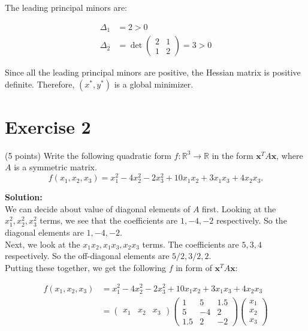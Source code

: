 \documentclass{article}
\begin{document}
The leading principal minors are:

\begin{align*}
    \Delta_1 &= 2 > 0 \\
    \Delta_2 &= \det\begin{pmatrix}
        2 & 1 \\
        1 & 2
    \end{pmatrix} = 3 > 0
\end{align*}

Since all the leading principal minors are positive, the Hessian matrix is positive definite. Therefore, $(x^*,y^*)$ is a global minimizer.

\newpage

\section*{Exercise 2}
(5 points) Write the following quadratic form $f: \mathbb{R}^3 \to \mathbb{R}$ in the form $\mathbf{x}^T A\mathbf{x}$, where $A$ is a symmetric matrix.
$$f(x_1,x_2,x_3) = x_1^2 - 4x_2^2 - 2x_3^2 + 10x_1x_2 + 3x_1x_3 + 4x_2x_3.$$

\textbf{Solution:} \\

We can decide about value of diagonal elements of $A$ first. Looking at the $x_1^2, x_2^2, x_3^2$ terms, we see that the coefficients are $1, -4, -2$ respectively. So the diagonal elements are $1, -4, -2$. \\

Next, we look at the $x_1x_2, x_1x_3, x_2x_3$ terms. The coefficients are $5, 3, 4$ respectively. So the off-diagonal elements are $5/2, 3/2, 2$. \\

Putting these together, we get the following $f$ in form of $\mathbf{x}^T A\mathbf{x}$:

\begin{align*}
    f(x_1,x_2,x_3) &= x_1^2 - 4x_2^2 - 2x_3^2 + 10x_1x_2 + 3x_1x_3 + 4x_2x_3 \\
    &= \begin{pmatrix}
        x_1 & x_2 & x_3
    \end{pmatrix}
    \begin{pmatrix}
        1 & 5 & 1.5 \\
        5 & -4 & 2 \\
        1.5 & 2 & -2
    \end{pmatrix}
    \begin{pmatrix}
        x_1 \\
        x_2 \\
        x_3
    \end{pmatrix}
\end{align*}
\newpage
\end{document}
